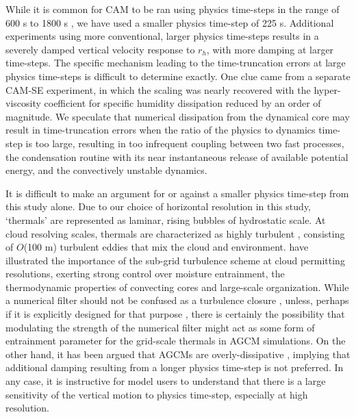 While it is common for CAM to be ran using physics time-steps in the range of 600 s to 1800 s \citep{OETAL2013JCLIM,WETAL2014JAMES,RETAL2015JAS,ZetAl2014JCb,RM2016GRL}, we have used a smaller physics time-step of 225 s. Additional experiments using more conventional, larger physics time-steps results in a severely damped vertical velocity response to $r_h$, with more damping at larger time-steps. The specific mechanism leading to the time-truncation errors at large physics time-steps is difficult to determine exactly. One clue came from a separate CAM-SE experiment, in which the scaling was nearly recovered with the hyper-viscosity coefficient for specific humidity dissipation reduced by an order of magnitude. We speculate that numerical dissipation from the dynamical core may result in time-truncation errors when the ratio of the physics to dynamics time-step is too large, resulting in too infrequent coupling between two fast processes, the condensation routine with its near instantaneous release of available potential energy, and the convectively unstable dynamics.

It is difficult to make an argument for or against a smaller physics time-step from this study alone. Due to our choice of horizontal resolution in this study, ‘thermals’ are represented as laminar, rising bubbles of hydrostatic scale. At cloud resolving scales, thermals are characterized as highly turbulent \citep{GETAL1991JAS,WS1998MWR,BETAL2002MWR}, consisting of $O$(100 m) turbulent eddies that mix the cloud and environment. \cite{TETAL2017JAMES} have illustrated the importance of the sub-grid turbulence scheme at cloud permitting resolutions, exerting strong control over moisture entrainment, the thermodynamic properties of convecting cores and large-scale organization. While a numerical filter should not be confused as a turbulence closure \citep{JW2010LNCSE}, unless, perhaps if it is explicitly designed for that purpose \citep[e.g.,][]{GMR2007,METAL2015JCP}, there is certainly the possibility that modulating the strength of the numerical filter might act as some form of entrainment parameter for the grid-scale thermals in AGCM simulations. On the other hand, it has been argued that AGCMs are overly-dissipative \citep{S2005QJR,BETAL2012JCLIM}, implying that additional damping resulting from a longer physics time-step is not preferred. In any case, it is instructive for model users to understand that there is a large sensitivity of the vertical motion to physics time-step, especially at high resolution.

